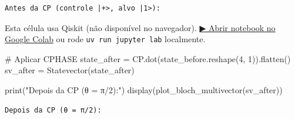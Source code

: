 \documentclass[
  brazilian,
]{report}
\newenvironment{Shaded}{\begin{snugshade}}{\end{snugshade}}
\newcommand{\BuiltInTok}[1]{\textcolor[rgb]{0.00,0.23,0.31}{#1}}
\newcommand{\CommentTok}[1]{\textcolor[rgb]{0.37,0.37,0.37}{#1}}
\newcommand{\DecValTok}[1]{\textcolor[rgb]{0.68,0.00,0.00}{#1}}
\newcommand{\NormalTok}[1]{\textcolor[rgb]{0.00,0.23,0.31}{#1}}
\newcommand{\OperatorTok}[1]{\textcolor[rgb]{0.37,0.37,0.37}{#1}}
\newcommand{\StringTok}[1]{\textcolor[rgb]{0.13,0.47,0.30}{#1}}
\begin{document}
\begin{verbatim}
Antes da CP (controle |+>, alvo |1>):
\end{verbatim}

\begin{tcolorbox}[enhanced jigsaw, arc=.35mm, bottomrule=.15mm, bottomtitle=1mm, breakable, colback=white, colbacktitle=quarto-callout-warning-color!10!white, colframe=quarto-callout-warning-color-frame, coltitle=black, left=2mm, leftrule=.75mm, opacityback=0, opacitybacktitle=0.6, rightrule=.15mm, title=\textcolor{quarto-callout-warning-color}{\faExclamationTriangle}\hspace{0.5em}{⚛️ Célula Qiskit --- execute no Colab ou localmente}, titlerule=0mm, toprule=.15mm, toptitle=1mm]

Esta célula usa Qiskit (não disponível no navegador).
\href{https://colab.research.google.com/github/maxwellamaral/aula-quantum/blob/main/notebooks/00b-phases.ipynb}{▶
Abrir notebook no Google Colab} ou rode \texttt{uv\ run\ jupyter\ lab}
localmente.

\begin{Shaded}
\begin{Highlighting}[]


\CommentTok{\# Aplicar CPHASE}
\NormalTok{state\_after }\OperatorTok{=}\NormalTok{ CP.dot(state\_before.reshape(}\DecValTok{4}\NormalTok{, }\DecValTok{1}\NormalTok{)).flatten()}
\NormalTok{sv\_after }\OperatorTok{=}\NormalTok{ Statevector(state\_after)}

\BuiltInTok{print}\NormalTok{(}\StringTok{"Depois da CP (θ = π/2):"}\NormalTok{)}
\NormalTok{display(plot\_bloch\_multivector(sv\_after))}
\end{Highlighting}
\end{Shaded}

\end{tcolorbox}

\begin{verbatim}
Depois da CP (θ = π/2):
\end{verbatim}
\end{document}
